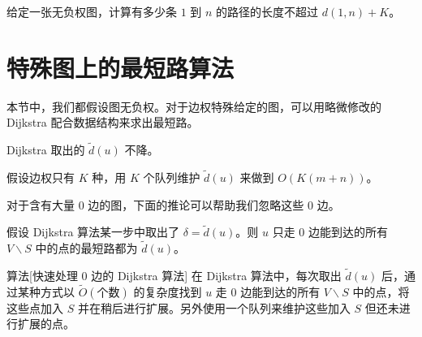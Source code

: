 
\begin{exercise}
    给定一张无负权图，计算有多少条 $1$ 到 $n$ 的路径的长度不超过 $d(1,n)+K$。
\end{exercise}

\section{特殊图上的最短路算法}

本节中，我们都假设图无负权。对于边权特殊给定的图，可以用略微修改的 Dijkstra 配合数据结构来求出最短路。

\begin{lemma}
    Dijkstra 取出的 $\tilde d(u)$ 不降。
\end{lemma}
\begin{example}
    假设边权只有 $K$ 种，用 $K$ 个队列维护 $\tilde d(u)$ 来做到 $O(K(m+n))$。
\end{example}

对于含有大量 $0$ 边的图，下面的推论可以帮助我们忽略这些 $0$ 边。
\begin{corollary}
    假设 Dijkstra 算法某一步中取出了 $\delta=\tilde d(u)$。则 $u$ 只走 $0$ 边能到达的所有 $V\backslash S$ 中的点的最短路都为 $\tilde d(u)$。
\end{corollary}
\begin{descbox}{算法}[快速处理 $0$ 边的 Dijkstra 算法]
    在 Dijkstra 算法中，每次取出 $\tilde d(u)$ 后，通过某种方式以 $\tilde O(\text{个数})$ 的复杂度找到 $u$ 走 $0$ 边能到达的所有 $V\backslash S$ 中的点，将这些点加入 $S$ 并在稍后进行扩展。另外使用一个队列来维护这些加入 $S$ 但还未进行扩展的点。
\end{descbox}


